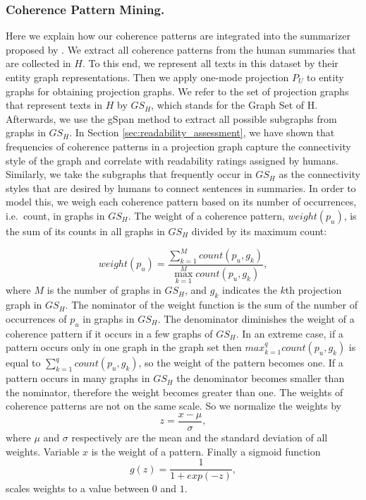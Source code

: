 \subsubsection{Coherence Pattern Mining.}
Here we explain how our coherence patterns are integrated into the summarizer proposed by . 
We extract all coherence patterns from the human summaries that are collected in $H$. 
To this end, we represent all texts in this dataset by their entity graph representations. 
Then we apply one-mode projection $P_U$ to entity graphs for obtaining projection graphs. 
We refer to the set of projection graphs that represent texts in $H$ by $GS_H$, which stands for the Graph Set of H. 
Afterwards, we use the gSpan method to extract all possible subgraphs from  graphs in $GS_H$. 
In Section \ref{sec:readability_assessment}, we have shown that frequencies of coherence patterns in a projection graph capture the connectivity style of the graph and correlate with readability ratings assigned by humans.  
Similarly, we take the subgraphs that frequently occur in $GS_H$ as the connectivity styles that are desired by humans to connect sentences in summaries. 
In order to model this, we weigh each coherence pattern based on its number of occurrences, i.e.\ count, in graphs in $GS_H$.  
The weight of a coherence pattern, $weight(p_u)$, is the sum of its counts in all graphs in $GS_H$ divided by its maximum count:

\begin{equation}
\label{eq:ch-weight}
weight(p_u) = \frac{\sum_{k=1}^{M}{count(p_u,g_k)}}{\max_{k=1}^{M}{count(p_u,g_k)}},
\end{equation}
where $M$ is the number of graphs in $GS_H$, and $g_k$ indicates the $k$th projection graph in $GS_H$.
The nominator of the weight function is the sum of the number of occurrences of $p_u$ in graphs in $GS_H$. 
The denominator diminishes the weight of a coherence pattern if it  occurs in a few graphs of $GS_H$. 
In an extreme case, if a pattern occurs only in one graph in the graph set then $max_{k=1}^{q}{count(p_u,g_k)}$ is equal to $\sum_{k=1}^{q}{count(p_u,g_k)}$, so the weight of the pattern becomes one. 
If a pattern occurs in many graphs in $GS_H$ the denominator becomes smaller than the nominator, therefore the weight becomes greater than one. 
The weights of coherence patterns are not on the same scale.  
So we normalize the weights by 
\begin{equation}
z = \frac{x-\mu}{\sigma},
\end{equation}
where $\mu$ and $\sigma$ respectively are the mean and the standard deviation of all weights. Variable $x$ is the weight of a pattern.   
Finally a sigmoid function
\begin{equation}
 g(z) = \frac{1}{1+exp(-z)},
\end{equation}
scales weights to a value between $0$ and $1$. 

